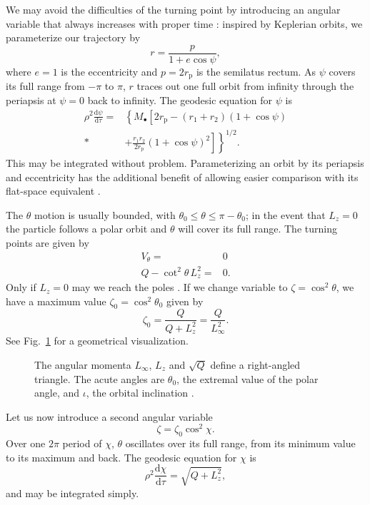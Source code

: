 \documentclass[useAMS,usedcolumn,usegraphicx,usenatbib]{mn2e}
\newcommand{\figref}[1]{Fig.~\ref{fig:#1}}
\newcommand{\sub}[1]{\ensuremath{_\mathrm{#1}}}
\newcommand{\dd}{\ensuremath{\mathrm{d}}}
\newcommand{\diff}[2]{\ensuremath{\frac{\dd {#1}}{\dd {#2}}}}
\begin{document}
We may avoid the difficulties of the turning point by introducing an angular variable that always increases with proper time \citep{Drasco2004}: inspired by Keplerian orbits, we parameterize our trajectory by
\begin{equation}
r = \frac{p}{1+e\cos\psi},
\end{equation}
where $e = 1$ is the eccentricity and $p = 2r\sub{p}$ is the semilatus rectum. As $\psi$ covers its full range from $-\pi$ to $\pi$, $r$ traces out one full orbit from infinity through the periapsis at $\psi = 0$ back to infinity. The geodesic equation for $\psi$ is
\begin{align}
\rho^2 \diff{\psi}{\tau} = {} & \left\{M_\bullet\left[2r\sub{p} - \left(r_1 + r_2\right)\left(1 + \cos\psi\right) \right.\right. \nonumber \\*
 {} & + \left.\left. \frac{r_1 r_2}{2r\sub{p}}\left(1 + \cos\psi\right)^2\right]\right\}^{1/2}.
\end{align}
This may be integrated without problem. Parameterizing an orbit by its periapsis and eccentricity has the additional benefit of allowing easier comparison with its flat-space equivalent \citep{Gair2005}.

The $\theta$ motion is usually bounded, with $\theta_0 \leq \theta \leq \pi - \theta_0$; in the event that $L_z = 0$ the particle follows a polar orbit and $\theta$ will cover its full range. The turning points are given by
\begin{align}
V_\theta = {} & 0 \nonumber \\
Q - \cot^2\theta\, L_z^2= {} & 0.
\end{align}
Only if $L_z = 0$ may we reach the poles \citep{Wilkins1972}. If we change variable to $\zeta = \cos^2\theta$, we have a maximum value $\zeta_0 = \cos^2\theta_0$ given by
\begin{equation}
\label{eq:theta_0}
\zeta_0 = \frac{Q}{Q+L_z^2} = \frac{Q}{L_\infty^2}.
\end{equation}
See \figref{L_triangle} for a geometrical visualization.
\begin{figure}[tbp]
\begin{center}
    \caption{The angular momenta $L_\infty$, $L_z$ and $\sqrt{Q}$ define a right-angled triangle. The acute angles are $\theta_0$, the extremal value of the polar angle, and $\iota$, the orbital inclination \citep{Glampedakis2002a}.}%
   \label{fig:L_triangle}
\end{center}
\end{figure}
Let us now introduce a second angular variable \citep{Drasco2004}
\begin{equation}
\zeta = \zeta_0\cos^2\chi.
\end{equation}
Over one $2\pi$ period of $\chi$, $\theta$ oscillates over its full range, from its minimum value to its maximum and back. The geodesic equation for $\chi$ is
\begin{equation}
\rho^2\diff{\chi}{\tau} = \sqrt{Q + L_z^2},
\end{equation}
and may be integrated simply.
\end{document}
